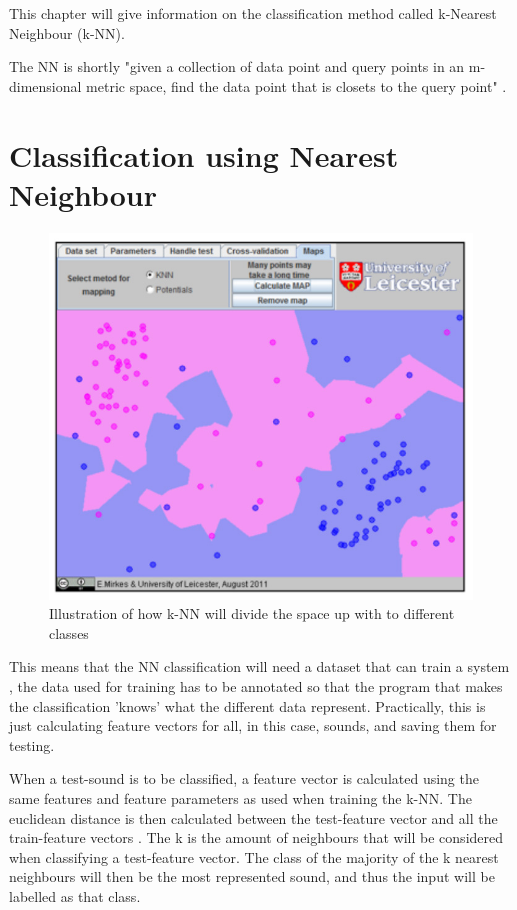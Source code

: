 
This chapter will give information on the classification method called k-Nearest Neighbour (k-NN).

The NN is shortly "given a collection of data point and query points in an m-dimensional metric space, find the data point that is closets to the query point"
\citep{meaningfulNN}.
\section{Classification using Nearest Neighbour}

\begin{figure}[h]
	\begin{center}
		\includegraphics[scale = 0.5]{fig/KNNfig.jpg}
		\caption{Illustration of how k-NN will divide the space up with to different classes \citep{introKNN}}
		\label{KNN fig}
	\end{center}
\end{figure}
This means that the NN classification will need a dataset that can train a system \citep{Sinyor05}, the data used for training has to be annotated so that the program that makes the classification 'knows' what the different data represent. Practically, this is just calculating feature vectors for all, in this case, sounds, and saving them for testing.

When a test-sound is to be classified, a feature vector is calculated using the same features and feature parameters as used when training the k-NN.
The euclidean distance is then calculated between the test-feature vector and all the train-feature vectors \citep{NNHD}.
The k is the amount of neighbours that will be considered when classifying a test-feature vector. The class of the majority of the k nearest neighbours will then be the most represented sound, and thus the input will be labelled as that class\citep{introKNN}.

